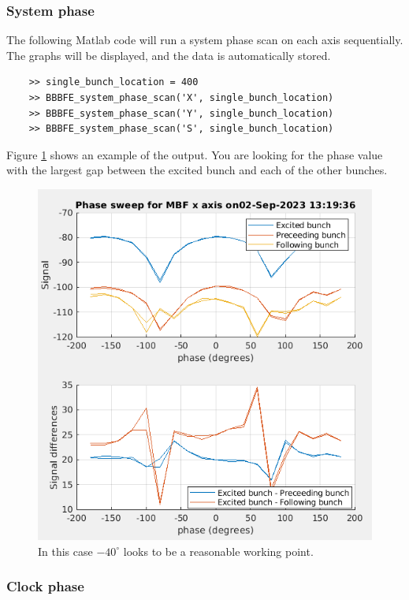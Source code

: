 \documentclass{report}
\begin{document}
\subsubsection{System phase}
 
The following Matlab code will run a system phase scan on each axis sequentially. The graphs will be displayed, and the data is automatically stored. 

\begin{verbatim}
    >> single_bunch_location = 400
    >> BBBFE_system_phase_scan('X', single_bunch_location)
    >> BBBFE_system_phase_scan('Y', single_bunch_location)
    >> BBBFE_system_phase_scan('S', single_bunch_location)
\end{verbatim}

Figure \ref{fig:frontend_system_phase_scan} shows an example of the output. You are looking for the phase value with the largest gap between the excited bunch and each of the other bunches. 

\begin{figure}[ht]
    \centering
    \includegraphics[width=0.8\linewidth]{system_phase_sweep.png}
    \caption{In this case $-40^\circ$ looks to be a reasonable working point.}
    \label{fig:frontend_system_phase_scan}
\end{figure}
\clearpage
\subsubsection{Clock phase} 
\end{document}
